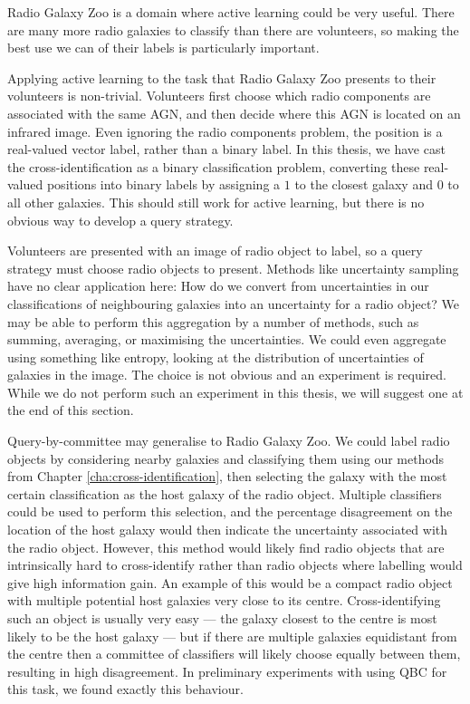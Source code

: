     Radio Galaxy Zoo \citep{banfield15} is a domain where active learning could
    be very useful. There are many more radio galaxies to classify than there
    are volunteers, so making the best use we can of their labels is
    particularly important.

    Applying active learning to the task that Radio Galaxy Zoo presents to their
    volunteers is non-trivial. Volunteers first choose which radio components
    are associated with the same AGN, and then decide where this AGN is located
    on an infrared image. Even ignoring the radio components problem, the
    position is a real-valued vector label, rather than a binary label. In this
    thesis, we have cast the cross-identification as a binary classification
    problem, converting these real-valued positions into binary labels by
    assigning a $1$ to the closest galaxy and $0$ to all other galaxies. This
    should still work for active learning, but there is no obvious way to
    develop a query strategy.

    Volunteers are presented with an image of radio object to label, so a query
    strategy must choose radio objects to present. Methods like uncertainty
    sampling have no clear application here: How do we convert from
    uncertainties in our classifications of neighbouring galaxies into an
    uncertainty for a radio object? We may be able to perform this aggregation
    by a number of methods, such as summing, averaging, or maximising the
    uncertainties. We could even aggregate using something like entropy, looking
    at the distribution of uncertainties of galaxies in the image. The choice is
    not obvious and an experiment is required. While we do not perform such an
    experiment in this thesis, we will suggest one at the end of this section.

    Query-by-committee may generalise to Radio Galaxy Zoo. We could label radio
    objects by considering nearby galaxies and classifying them using our
    methods from Chapter \ref{cha:cross-identification}, then selecting the
    galaxy with the most certain classification as the host galaxy of the radio
    object. Multiple classifiers could be used to perform this selection, and
    the percentage disagreement on the location of the host galaxy would then
    indicate the uncertainty associated with the radio object. However, this
    method would likely find radio objects that are intrinsically hard to
    cross-identify rather than radio objects where labelling would give high
    information gain. An example of this would be a compact radio object with
    multiple potential host galaxies very close to its centre. Cross-identifying
    such an object is usually very easy --- the galaxy closest to the centre is
    most likely to be the host galaxy --- but if there are multiple galaxies
    equidistant from the centre then a committee of classifiers will likely
    choose equally between them, resulting in high disagreement. In preliminary
    experiments with using QBC for this task, we found exactly this behaviour.


